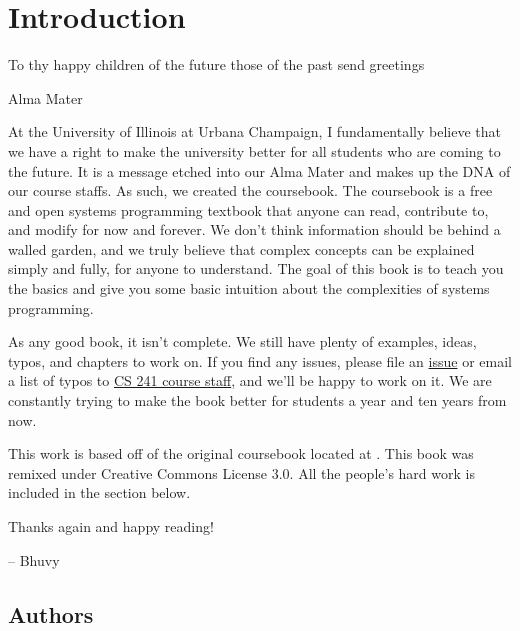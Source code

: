 \chapter{Introduction}

\epigraph{To thy happy children of the future those of the past send greetings}{Alma Mater}

At the University of Illinois at Urbana Champaign, I fundamentally believe that we have a right to make the university better for all students who are coming to the future.
It is a message etched into our Alma Mater and makes up the DNA of our course staffs.
As such, we created the coursebook.
The coursebook is a free and open systems programming textbook that anyone can read, contribute to, and modify for now and forever.
We don't think information should be behind a walled garden, and we truly believe that complex concepts can be explained simply and fully, for anyone to understand.
The goal of this book is to teach you the basics and give you some basic intuition about the complexities of systems programming.

As any good book, it isn't complete.
We still have plenty of examples, ideas, typos, and chapters to work on.
If you find any issues, please file an \href{https://github.com/illinois-cs241/illinois-cs241.github.io/issues}{issue} or email a list of typos to \href{http://cs241.cs.illinois.edu/staff}{CS 241 course staff}, and we'll be happy to work on it.
We are constantly trying to make the book better for students a year and ten years from now.

This work is based off of the original coursebook located at .
This book was remixed under Creative Commons License 3.0.
All the people's hard work is included in the section below.

Thanks again and happy reading!

-- Bhuvy

\section{Authors}



